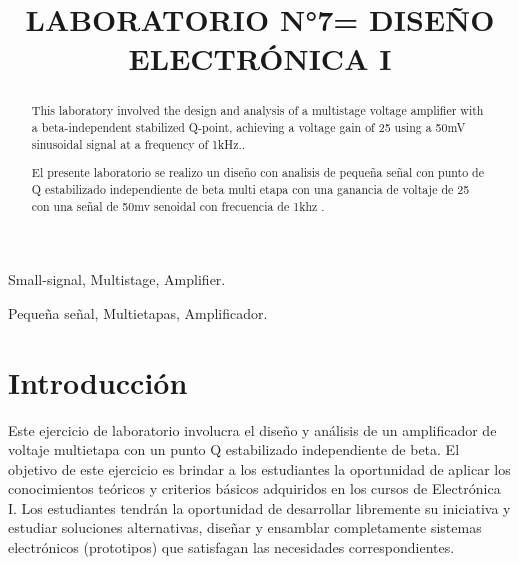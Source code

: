 \documentclass[conference]{IEEEtran}
\begin{document}
\title{LABORATORIO N°7= DISEÑO ELECTRÓNICA I
}
\author{
\and
{}
\and
{}
}


\maketitle

\begin{abstract}
This laboratory involved the design and analysis of a multistage voltage amplifier with a beta-independent stabilized Q-point, achieving a voltage gain of 25 using a 50mV sinusoidal signal at a frequency of 1kHz..\\
\end{abstract}
\renewcommand\IEEEkeywordsname{Keywords}
\begin{IEEEkeywords}
 Small-signal, Multistage, Amplifier.\\
\end{IEEEkeywords}


\begin{abstract}
El presente laboratorio se realizo un diseño con analisis de pequeña señal con punto de Q estabilizado independiente de  beta multi etapa con una ganancia de voltaje de 25 con una señal de 50mv senoidal con frecuencia de 1khz .\\
\end{abstract}

\renewcommand\IEEEkeywordsname{Palabras Clave}
\begin{IEEEkeywords}
Pequeña señal, Multietapas, Amplificador.
\end{IEEEkeywords}


\section{Introducción}
Este ejercicio de laboratorio involucra el diseño y análisis de un amplificador de voltaje multietapa con un punto Q estabilizado independiente de beta. El objetivo de este ejercicio es brindar a los estudiantes la oportunidad de aplicar los conocimientos teóricos y criterios básicos adquiridos en los cursos de Electrónica I. Los estudiantes tendrán la oportunidad de desarrollar libremente su iniciativa y estudiar soluciones alternativas, diseñar y ensamblar completamente sistemas electrónicos (prototipos) que satisfagan las necesidades correspondientes.
\end{document}
